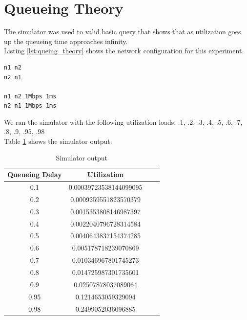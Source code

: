 \documentclass[fleqn,11pt]{article}
\begin{document}
\section{Queueing Theory}
\vspace{0.5cm}

The simulator was used to valid basic query that shows that as utilization goes
up the queueing time approaches infinity.\\

\pagebreak
Listing \ref{lst:queing_theory} shows the network configuration for this experiment.

\vspace{0.5cm}
\begin{lstlisting}[caption={Network configuration},label={lst:queing_theory}]
n1 n2
n2 n1

n1 n2 1Mbps 1ms
n2 n1 1Mbps 1ms
\end{lstlisting}
\vspace{0.5cm}


\noindent
We ran the simulator with the following utilization loads: .1, .2, .3, .4, .5,
.6, .7, .8, .9, .95, .98\\

\noindent
Table \ref{tab:queing_theory} shows the simulator output.

\begin{table}[h]
  \caption{Simulator output}
  \label{tab:queing_theory}
  \begin{center}
    \begin{tabular}{cccc}
      \toprule
      Queueing Delay & Utilization & \\
      \midrule
      0.1 & 0.00039723538144099095\\
      0.2 & 0.0009259551823570379\\
      0.3 & 0.0015353808146987397\\
      0.4 & 0.0022040796728314584\\
      0.5 & 0.0040643837154374285\\
      0.6 & 0.005178718239070869\\
      0.7 & 0.010346967801745273\\
      0.8 & 0.014725987301735601\\
      0.9 & 0.02507878037089064\\
      0.95 & 0.1214653059329094\\
      0.98 & 0.2499052036096885\\
      \bottomrule
    \end{tabular}
  \end{center}
\end{table}
\end{document}
